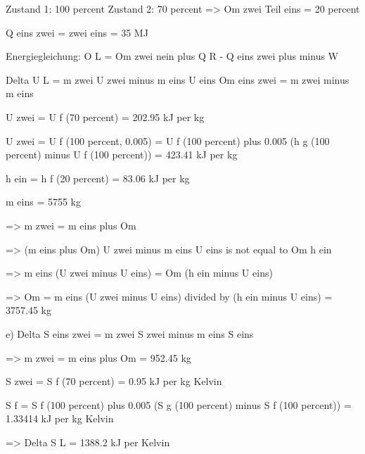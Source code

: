 Zustand 1: 100 percent  
Zustand 2: 70 percent  
=> Om zwei Teil eins = 20 percent  

Q eins zwei = zwei eins = 35 MJ  

Energiegleichung: O L = Om zwei nein plus Q R - Q eins zwei plus minus W  

Delta U L = m zwei U zwei minus m eins U eins  
Om eins zwei = m zwei minus m eins  

U zwei = U f (70 percent) = 202.95 kJ per kg  

U zwei = U f (100 percent, 0.005) = U f (100 percent) plus 0.005 (h g (100 percent) minus U f (100 percent)) = 423.41 kJ per kg  

h ein = h f (20 percent) = 83.06 kJ per kg  

m eins = 5755 kg  

=> m zwei = m eins plus Om  

=> (m eins plus Om) U zwei minus m eins U eins is not equal to Om h ein  

=> m eins (U zwei minus U eins) = Om (h ein minus U eins)  

=> Om = m eins (U zwei minus U eins) divided by (h ein minus U eins) = 3757.45 kg  

e) Delta S eins zwei = m zwei S zwei minus m eins S eins  

=> m zwei = m eins plus Om = 952.45 kg  

S zwei = S f (70 percent) = 0.95 kJ per kg Kelvin  

S f = S f (100 percent) plus 0.005 (S g (100 percent) minus S f (100 percent)) = 1.33414 kJ per kg Kelvin  

=> Delta S L = 1388.2 kJ per Kelvin